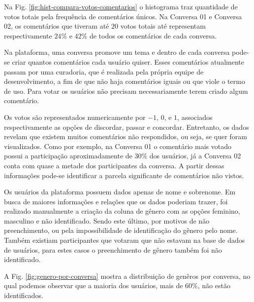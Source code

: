Na Fig. \ref{fig:hist-compara-votos-comentarios} o histograma traz quantidade de votos totais pela frequência de comentários únicos. Na Conversa 01 e Conversa 02, os comentários que tiveram até $20$ votos totais até representam respectivamente $24\%$ e $42\%$ de todos os comentários de cada conversa.


Na plataforma, uma conversa promove um tema e dentro de cada conversa pode-se criar quantos comentários cada usuário quiser. Esses comentários atualmente passam por uma curadoria, que é realizada pela própria equipe de desenvolvimento, a fim de que não haja comentários iguais ou que viole o termo de uso. 
Para votar os usuários não precisam necessariamente terem criado algum comentário. 

Os votos são representados numericamente por $-1$, $0$, e $1$, associados respectivamente as opções de discordar, passar e concordar. Entretanto, os dados revelam que existem muitos comentários não respondidos, ou seja, se quer foram visualizados. Como por exemplo, na Conversa 01 o comentário mais votado possui a participação aproximadamente de $30\%$ dos usuários, já a Conversa 02 conta com 
quase a metade dos participantes da conversa. A partir dessas informações pode-se identificar a parcela significante de comentários não vistos.


Os usuários da plataforma possuem dados apenas de nome e sobrenome. Em busca de maiores informações e relações que os dados poderiam trazer, foi realizado manualmente a criação da coluna de gênero com as opções feminino, masculino e não identificado. Sendo este último, por motivos de não preenchimento, ou pela impossibilidade de identificação do gênero pelo nome. Também existiam participantes que votaram que não estavam na base de dados de usuários, para estes casos o preenchimento de gênero também foi não identificado.

A Fig. \ref{fig:genero-por-conversa} mostra a distribuição de genêros por conversa, no qual podemos observar que a maioria dos usuários, mais de $60\%$, não estão identificados.

